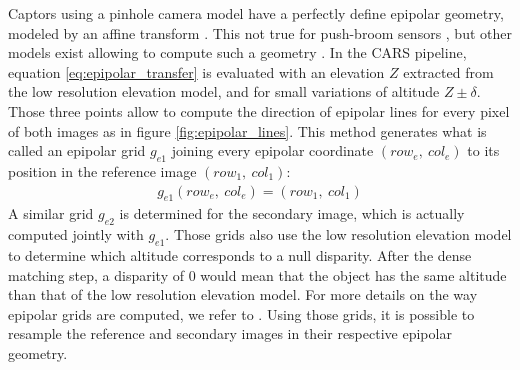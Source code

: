 Captors using a pinhole camera model have a perfectly define epipolar geometry, modeled by an affine transform \cite{hartley_multiple_2004}. This not true for push-broom sensors \cite{morgan_epipolar_2004}, but other models exist allowing to compute such a geometry \cite{oh_piecewise_2010, de_franchis_stereo-rectification_2014, koh_unified_2016, michel_new_2020}. In the CARS pipeline, equation \eqref{eq:epipolar_transfer} is evaluated with an elevation $Z$ extracted from the low resolution elevation model, and for small variations of altitude $Z\pm\delta$. Those three points allow to compute the direction of epipolar lines for every pixel of both images as in figure \ref{fig:epipolar_lines}. This method generates what is called an epipolar grid $g_{e1}$ joining every epipolar coordinate $(row_e, ~col_e)$ to its position in the reference image $(row_1, ~col_1)$:
\begin{align}
    g_{e1}(row_e, ~col_e) = (row_1, ~col_1)
\end{align}
A similar grid $g_{e2}$ is determined for the secondary image, which is actually computed jointly with $g_{e1}$. Those grids also use the low resolution elevation model to determine which altitude corresponds to a null disparity. After the dense matching step, a disparity of $0$ would mean that the object has the same altitude than that of the low resolution elevation model. For more details on the way epipolar grids are computed, we refer to \cite{michel_new_2020}. Using those grids, it is possible to resample the reference and secondary images in their respective epipolar geometry. 

